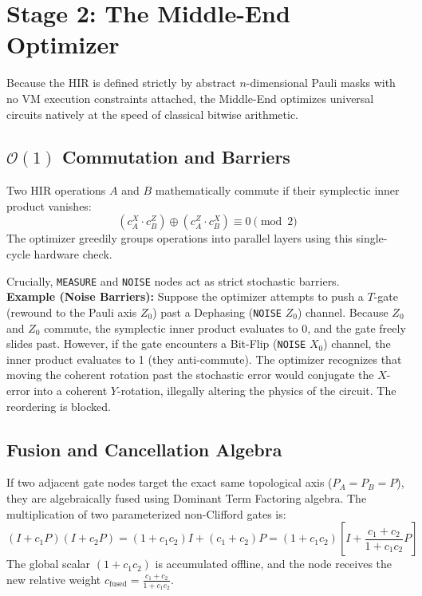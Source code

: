 \documentclass[11pt]{article}
\begin{document}
\section{Stage 2: The Middle-End Optimizer}

Because the HIR is defined strictly by abstract $n$-dimensional Pauli masks with no VM execution constraints attached, the Middle-End optimizes universal circuits natively at the speed of classical bitwise arithmetic.

\subsection{$\mathcal{O}(1)$ Commutation and Barriers}
Two HIR operations $A$ and $B$ mathematically commute if their symplectic inner product vanishes:
\begin{equation}
    (c^X_A \cdot c^Z_B) \oplus (c^Z_A \cdot c^X_B) \equiv 0 \pmod 2
\end{equation}
The optimizer greedily groups operations into parallel layers using this single-cycle hardware check.

Crucially, \texttt{MEASURE} and \texttt{NOISE} nodes act as strict stochastic barriers. \\
\textbf{Example (Noise Barriers):} Suppose the optimizer attempts to push a $T$-gate (rewound to the Pauli axis $Z_0$) past a Dephasing (\texttt{NOISE} $Z_0$) channel. Because $Z_0$ and $Z_0$ commute, the symplectic inner product evaluates to 0, and the gate freely slides past. However, if the gate encounters a Bit-Flip (\texttt{NOISE} $X_0$) channel, the inner product evaluates to 1 (they anti-commute). The optimizer recognizes that moving the coherent rotation past the stochastic error would conjugate the $X$-error into a coherent $Y$-rotation, illegally altering the physics of the circuit. The reordering is blocked.

\subsection{Fusion and Cancellation Algebra}
If two adjacent gate nodes target the exact same topological axis ($P_A = P_B = P$), they are algebraically fused using Dominant Term Factoring algebra. The multiplication of two parameterized non-Clifford gates is:
\begin{equation}
    (I + c_1 P)(I + c_2 P) = (1 + c_1 c_2)I + (c_1 + c_2)P = (1 + c_1 c_2)\left[I + \frac{c_1 + c_2}{1 + c_1 c_2}P\right]
\end{equation}
The global scalar $(1 + c_1 c_2)$ is accumulated offline, and the node receives the new relative weight $c_{\text{fused}} = \frac{c_1 + c_2}{1 + c_1 c_2}$.
\end{document}
